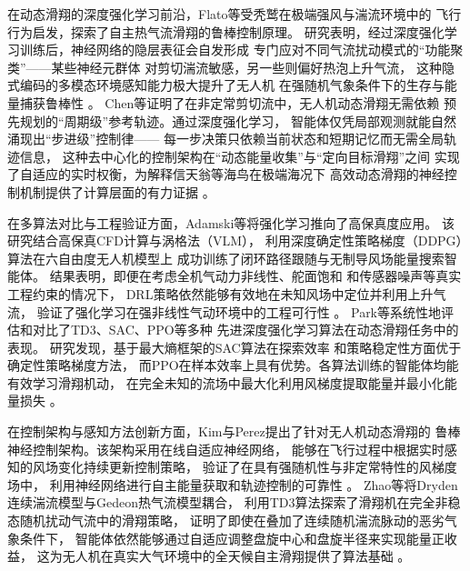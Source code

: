 在动态滑翔的深度强化学习前沿，Flato等受秃鹫在极端强风与湍流环境中的
飞行行为启发，探索了自主热气流滑翔的鲁棒控制原理。
研究表明，经过深度强化学习训练后，神经网络的隐层表征会自发形成
专门应对不同气流扰动模式的“功能聚类”——某些神经元群体
对剪切湍流敏感，另一些则偏好热泡上升气流，
这种隐式编码的多模态环境感知能力极大提升了无人机
在强随机气象条件下的生存与能量捕获鲁棒性
\cite{flatoThermalSoaringDRL2024}。
Chen等证明了在非定常剪切流中，无人机动态滑翔无需依赖
预先规划的“周期级”参考轨迹。通过深度强化学习，
智能体仅凭局部观测就能自然涌现出“步进级”控制律——
每一步决策只依赖当前状态和短期记忆而无需全局轨迹信息，
这种去中心化的控制架构在“动态能量收集”与“定向目标滑翔”之间
实现了自适应的实时权衡，为解释信天翁等海鸟在极端海况下
高效动态滑翔的神经控制机制提供了计算层面的有力证据
\cite{chenDynamicSoaringDRL2026}。

在多算法对比与工程验证方面，Adamski等将强化学习推向了高保真度应用。
该研究结合高保真CFD计算与涡格法（VLM），
利用深度确定性策略梯度（DDPG）算法在六自由度无人机模型上
成功训练了闭环路径跟随与无制导风场能量搜索智能体。
结果表明，即便在考虑全机气动力非线性、舵面饱和
和传感器噪声等真实工程约束的情况下，
DRL策略依然能够有效地在未知风场中定位并利用上升气流，
验证了强化学习在强非线性气动环境中的工程可行性
\cite{adamskiTowardsDevelopmentDynamic2023}。
Park等系统性地评估和对比了TD3、SAC、PPO等多种
先进深度强化学习算法在动态滑翔任务中的表现。
研究发现，基于最大熵框架的SAC算法在探索效率
和策略稳定性方面优于确定性策略梯度方法，
而PPO在样本效率上具有优势。各算法训练的智能体均能有效学习滑翔机动，
在完全未知的流场中最大化利用风梯度提取能量并最小化能量损失
\cite{parkApplicationReinforcementLearning2025}。

在控制架构与感知方法创新方面，Kim与Perez提出了针对无人机动态滑翔的
鲁棒神经控制架构。该架构采用在线自适应神经网络，
能够在飞行过程中根据实时感知的风场变化持续更新控制策略，
验证了在具有强随机性与非定常特性的风梯度场中，
利用神经网络进行自主能量获取和轨迹控制的可靠性
\cite{kimRobustNeurocontrolAutonomous2022}。
Zhao等将Dryden连续湍流模型与Gedeon热气流模型耦合，
利用TD3算法探索了滑翔机在完全非稳态随机扰动气流中的滑翔策略，
证明了即使在叠加了连续随机湍流脉动的恶劣气象条件下，
智能体依然能够通过自适应调整盘旋中心和盘旋半径来实现能量正收益，
这为无人机在真实大气环境中的全天候自主滑翔提供了算法基础
\cite{zhaoEnergyHarvestingStrategy2023}。

